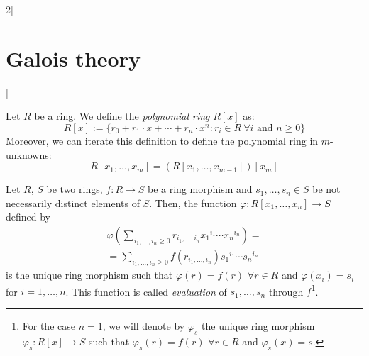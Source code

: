 \documentclass[../../../main.tex]{subfiles}
\begin{document}
\begin{multicols}{2}[\section{Galois theory}]
\begin{prop}
  \end{prop}
  \begin{definition}
    Let $R$ be a ring. We define the  \emph{polynomial ring} $R[x]$ as: $$R[x]:=\{r_0+r_1\cdot x+\cdots+r_n\cdot x^n:r_i\in R\ \forall i\text{ and }n\geq 0\}$$ Moreover, we can iterate this definition to define the polynomial ring in $m$-unknowns: $$R[x_1,\ldots,x_m]=\left(R[x_1,\ldots,x_{m-1}]\right)[x_m]$$
  \end{definition}
  \begin{prop}
    Let $R$, $S$ be two rings, $f:R\rightarrow S$ be a ring morphism and $s_1,\ldots,s_n\in S$ be not necessarily distinct elements of $S$. Then, the function $\varphi:R[x_1,\ldots,x_n]\rightarrow S$ defined by
    \begin{multline*}
      \varphi\left(\sum_{i_1,\ldots,i_n\geq 0}r_{i_1,\ldots,i_n}{x_1}^{i_1}\cdots {x_n}^{i_n}\right)=\\=\sum_{i_1,\ldots,i_n\geq 0}f(r_{i_1,\ldots,i_n}){s_1}^{i_1}\cdots {s_n}^{i_n}
    \end{multline*}
    is the unique ring morphism such that $\varphi(r)=f(r)$ $\forall r\in R$ and $\varphi(x_i)=s_i$ for $i=1,\ldots,n$. This function is called \emph{evaluation} of $s_1,\ldots,s_n$ through $f$\footnote{For the case $n=1$, we will denote by $\varphi_s$ the unique ring morphism $\varphi_s:R[x]\rightarrow S$ such that $\varphi_s(r)=f(r)$ $\forall r\in R$ and $\varphi_s(x)=s$.}.
  \end{prop}

\end{multicols}
\end{document}
